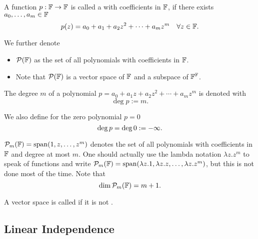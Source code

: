 \begin{mydef}
  A function $p: \mathbb{F} \to \mathbb{F}$ is called a  with coefficients in $\mathbb{F}$, if there exists $a_0, \ldots, a_m \in \mathbb{F}$ \st
  \begin{equation}
    p(z)=a_0 + a_1 + a_2z^2 + \cdots + a_m z^m \quad \forall z \in \mathbb{F}.
  \end{equation}

  We further denote
  \begin{itemize}
    \item $\mathcal{P} (\mathbb{F})$ as the set of all polynomials with coefficients in $\mathbb{F}$.
    \item Note that $\mathcal{P} (\mathbb{F})$ is a vector space of $\mathbb{F}$ and a subspace of $\mathbb{F}^{\mathbb{F}}$.
  \end{itemize}
\end{mydef}

\begin{mydef}
  The degree $m$ of a polynomial $p=a_0+a_1z+a_2z^2+\cdots+a_mz^m$ is denoted with \begin{equation}
    \deg p := m.
  \end{equation}

  We also define for the zero polynomial $p=0$
  \begin{equation}
    {\operatorname{deg} \,} p = {\operatorname{deg} \,} 0 := -\infty.
  \end{equation}
\end{mydef}

\begin{mydef} 
  $\mathcal{P}_m (\mathbb{F} )=\operatorname{span} (1,z,\dots,z^m)$ denotes the set of all polynomials with coefficients in $\mathbb{F}$ and degree at most $m$. One should actually use the lambda notation $\lambda z.z^m$ to speak of functions and write $\mathcal{P}_m (\mathbb{F} )=\operatorname{span} (\lambda z.1,\lambda z.z,\dots,\lambda z.z^m)$, but this is not done most of the time. Note that
  \begin{equation}
    \dim \mathcal{P}_m(\mathbb{F}) = m+1.
  \end{equation}
\end{mydef}

\setcounter{thm}{12}
\begin{mydef}
  A vector space is called  if it is not \fd.
\end{mydef}


\subsection{Linear Independence}

